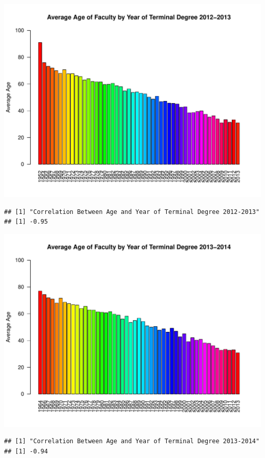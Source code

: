 \documentclass[12pt,a4paper]{article}\usepackage[]{graphicx}\usepackage[]{color}
\makeatletter
\def\maxwidth{ %
  \ifdim\Gin@nat@width>\linewidth
    \linewidth
  \else
    \Gin@nat@width
  \fi
}
\newenvironment{kframe}{%
 \def\at@end@of@kframe{}%
 \ifinner\ifhmode%
  \def\at@end@of@kframe{\end{minipage}}%
  \begin{minipage}{\columnwidth}%
 \fi\fi%
 \def\FrameCommand##1{\hskip\@totalleftmargin \hskip-\fboxsep
 \colorbox{shadecolor}{##1}\hskip-\fboxsep
     \hskip-\linewidth \hskip-\@totalleftmargin \hskip\columnwidth}%
 \MakeFramed {\advance\hsize-\width
   \@totalleftmargin\z@ \linewidth\hsize
   \@setminipage}}%
 {\par\unskip\endMakeFramed%
 \at@end@of@kframe}
\newenvironment{knitrout}{}{} %
\theoremstyle{definition}
\makeatother
\begin{document}
\begin{knitrout}
\includegraphics[width=\maxwidth]{figure/unnamed-chunk-11-9} 
\begin{kframe}\begin{verbatim}
## [1] "Correlation Between Age and Year of Terminal Degree 2012-2013"
## [1] -0.95
\end{verbatim}
\end{kframe}
\includegraphics[width=\maxwidth]{figure/unnamed-chunk-11-10} 
\begin{kframe}\begin{verbatim}
## [1] "Correlation Between Age and Year of Terminal Degree 2013-2014"
## [1] -0.94
\end{verbatim}
\end{kframe}
\end{knitrout}
\end{document}
